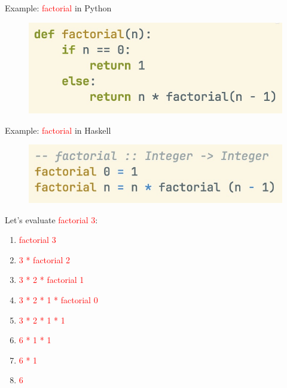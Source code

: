 \documentclass[pdf]{beamer}
\newcommand{\code}[1]{\textcolor{Red}{\textsf{#1}}}
\begin{document}
\begin{frame}{Example: \code{factorial} in Python}
  \begin{figure}[H]
    \centering
    \includegraphics[width=\linewidth]{factorial-py}
  \end{figure}
\end{frame}

\begin{frame}{Example: \code{factorial} in Haskell}
    \begin{figure}[H]
    \centering
    \includegraphics[width=\linewidth]{factorial-hs}
  \end{figure}

  \pause
  Let's evaluate \code{factorial 3}:

  \begin{enumerate}
    \item<1-> \code{factorial 3}
    \item<2-> \code{3 * factorial 2}
    \item<3-> \code{3 * 2 * factorial 1}
    \item<4-> \code{3 * 2 * 1 * factorial 0}
    \item<5-> \code{3 * 2 * 1 * 1}
    \item<6-> \code{6 * 1 * 1}
    \item<7-> \code{6 * 1}
    \item<8-> \code{6}
  \end{enumerate}

\end{frame}
\end{document}

